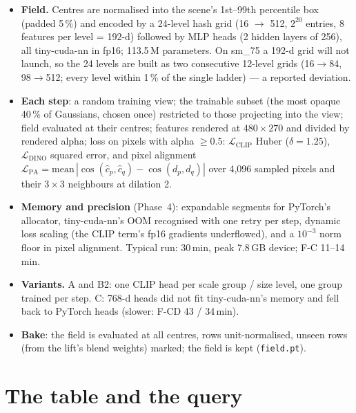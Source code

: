 \documentclass[11pt,a4paper]{article}
\newcommand{\code}[1]{\texttt{#1}}
\begin{document}
\begin{itemize}
  \item \textbf{Field.} Centres are normalised into the scene's 1st--99th percentile box (padded 5\,\%) and encoded by
        a 24-level hash grid (16 $\rightarrow$ 512, $2^{20}$ entries, 8 features per level = 192-d) followed by MLP heads
        (2 hidden layers of 256), all tiny-cuda-nn in fp16; 113.5\,M parameters. On sm\_75 a 192-d grid will not launch,
        so the 24 levels are built as two consecutive 12-level grids (16$\rightarrow$84, 98$\rightarrow$512; every
        level within 1\,\% of the single ladder) --- a reported deviation.
  \item \textbf{Each step}: a random training view; the trainable subset (the most opaque 40\,\% of Gaussians, chosen
        once) restricted to those projecting into the view; field evaluated at their centres; features rendered at
        $480\times270$ and divided by rendered alpha; loss on pixels with alpha $\ge0.5$:
        $\mathcal{L}_\mathrm{CLIP}$ Huber ($\delta=1.25$), $\mathcal{L}_\mathrm{DINO}$ squared error, and pixel
        alignment $\mathcal{L}_\mathrm{PA}=\mathrm{mean}\,|\cos(\hat c_p,\hat c_q)-\cos(d_p,d_q)|$ over 4{,}096 sampled
        pixels and their $3\times3$ neighbours at dilation 2.
  \item \textbf{Memory and precision} (Phase~4): expandable segments for PyTorch's allocator, tiny-cuda-nn's OOM
        recognised with one retry per step, dynamic loss scaling (the CLIP term's fp16 gradients underflowed), and a
        $10^{-3}$ norm floor in pixel alignment. Typical run: 30\,min, peak 7.8\,GB device; F-C 11--14\,min.
  \item \textbf{Variants.} A and B2: one CLIP head per scale group / size level, one group trained per step.
        C: 768-d heads did not fit tiny-cuda-nn's memory and fell back to PyTorch heads (slower: F-CD 43 / 34\,min).
  \item \textbf{Bake}: the field is evaluated at all centres, rows unit-normalised, unseen rows (from the lift's blend
        weights) marked; the field is kept (\code{field.pt}).
\end{itemize}

\section{The table and the query}
\end{document}

